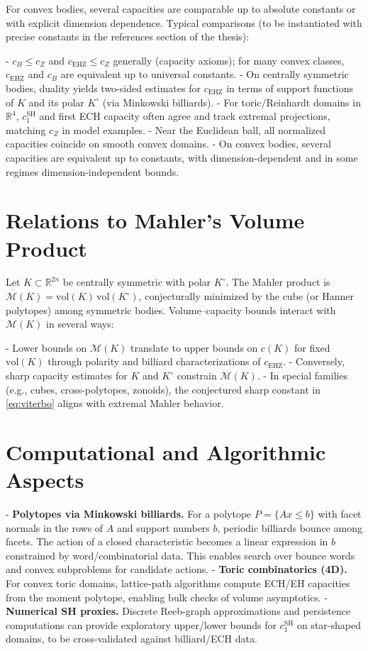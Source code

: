 For convex bodies, several capacities are comparable up to absolute constants or with explicit
dimension dependence. Typical comparisons (to be instantiated with precise constants in the
references section of the thesis):

- $c_B \le c_Z$ and $c_{\mathrm{EHZ}} \le c_Z$ generally (capacity axioms); for many convex classes,
  $c_{\mathrm{EHZ}}$ and $c_B$ are equivalent up to universal constants.
- On centrally symmetric bodies, duality yields two-sided estimates for $c_{\mathrm{EHZ}}$ in terms of
  support functions of $K$ and its polar $K^{\circ}$ (via Minkowski billiards).
- For toric/Reinhardt domains in $\mathbb{R}^4$, $c_1^{\mathrm{SH}}$ and first ECH capacity often agree and
  track extremal projections, matching $c_Z$ in model examples.
- Near the Euclidean ball, all normalized capacities coincide on smooth convex domains\cite{AbbondandoloBenedettiEdtmair2023}.
- On convex bodies, several capacities are equivalent up to constants, with dimension-dependent and
  in some regimes dimension-independent bounds\cite{ArtsteinAvidanMilmanOstrover2008}.

\section{Relations to Mahler's Volume Product}

Let $K \subset \mathbb{R}^{2n}$ be centrally symmetric with polar $K^{\circ}$. The Mahler product
is $\mathcal{M}(K)=\mathrm{vol}(K)\,\mathrm{vol}(K^{\circ})$, conjecturally minimized by the cube (or
Hanner polytopes) among symmetric bodies. Volume--capacity bounds interact with $\mathcal{M}(K)$ in
several ways:

- Lower bounds on $\mathcal{M}(K)$ translate to upper bounds on $c(K)$ for fixed $\mathrm{vol}(K)$ through
  polarity and billiard characterizations of $c_{\mathrm{EHZ}}$.
- Conversely, sharp capacity estimates for $K$ and $K^{\circ}$ constrain $\mathcal{M}(K)$.
- In special families (e.g., cubes, cross-polytopes, zonoids), the conjectured sharp constant in
  \eqref{eq:viterbo} aligns with extremal Mahler behavior.

\section{Computational and Algorithmic Aspects}

- \textbf{Polytopes via Minkowski billiards.} For a polytope $P=\{Ax\le b\}$ with facet normals in
  the rows of $A$ and support numbers $b$, periodic billiards bounce among facets. The action of a
  closed characteristic becomes a linear expression in $b$ constrained by word/combinatorial data.
  This enables search over bounce words and convex subproblems for candidate actions.
- \textbf{Toric combinatorics (4D).} For convex toric domains, lattice-path algorithms compute
  ECH/EH capacities from the moment polytope, enabling bulk checks of volume asymptotics.
- \textbf{Numerical SH proxies.} Discrete Reeb-graph approximations and persistence computations can
  provide exploratory upper/lower bounds for $c_1^{\mathrm{SH}}$ on star-shaped domains, to be
  cross-validated against billiard/ECH data.

